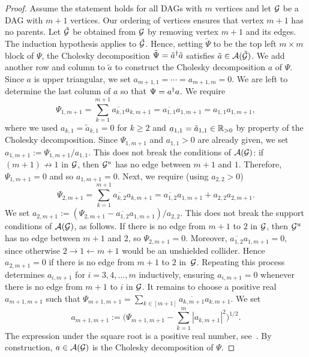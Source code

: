 \begin{proof}
	Assume the statement holds for all DAGs with $m$ vertices and let $\mathcal{G}$ be a DAG with $m+1$ vertices. Our ordering of vertices ensures that vertex $m+1$ has no parents. Let $\tilde{\mathcal{G}}$ be obtained from $\mathcal{G}$ by removing vertex $m+1$ and its edges.
	The induction hypothesis applies to $\tilde{\mathcal{G}}$.
	Hence, setting $\tilde{\Psi}$ to be the top left $m \times m$ block of $\Psi$,
	the Cholesky decomposition $\tilde{\Psi} = \tilde{a}^{\dagger} \tilde{a}$ satisfies $\tilde{a} \in \mathcal{A}(\tilde{\mathcal{G}})$. We add another row and column to $\tilde{a}$ to construct the Cholesky decomposition $a$ of $\Psi$.
	Since $a$ is upper triangular, we set $a_{m+1,1} = \cdots = a_{m+1,m} = 0$. We are left to determine the last column of $a$ so that $\Psi = a^{\dagger} a$.
	We require
	\[\Psi_{1,m+1} = \sum_{k=1}^{m+1} \overline{a_{k,1}} a_{k,m+1} = \overline{a_{1,1}} a_{1,m+1} = a_{1,1} a_{1,m+1}, \]
	where we used $a_{k,1} = \tilde{a}_{k,1} = 0$ for $k \geq 2$ and $a_{1,1} = \tilde{a}_{1,1} \in \mathbb R_{>0}$ by property of the Cholesky decomposition.
	Since $\Psi_{1,m+1}$ and $a_{1,1} > 0$ are already given, we set $a_{1,m+1} := \Psi_{1,m+1} / a_{1,1}$. This does not break the conditions of $\mathcal{A}(\mathcal{G})$: if $(m+1) \not\to 1$ in $\mathcal{G}$, then $\mathcal{G}^u$ has no edge between $m+1$ and $1$. Therefore, $\Psi_{1,m+1} = 0$ and so $a_{1,m+1} = 0$.
	Next, we require (using $a_{2,2} > 0$)
	\[\Psi_{2,m+1} = \sum_{k=1}^{m+1} \overline{a_{k,2}} a_{k,m+1} = \overline{a_{1,2}} a_{1,m+1} + a_{2,2} a_{2,m+1}. \]
	We set $a_{2,m+1} := (\Psi_{2,m+1} - \overline{a_{1,2}} a_{1,m+1}) / a_{2,2}$. This does not break the support conditions of $\mathcal{A}(\mathcal{G})$, as follows. If there is no edge from $m+1$ to $2$ in $\mathcal{G}$, then $\mathcal{G}^u$ has no edge between $m+1$ and $2$, so $\Psi_{2,m+1} = 0$. Moreover, $\overline{a_{1,2}} a_{1,m+1} = 0$, since otherwise $2 \to 1 \leftarrow m+1$ would be an unshielded collider. Hence $a_{2,m+1} = 0$ if there is no edge from $m+1$ to $2$ in~$\mathcal{G}$. Repeating this process determines $a_{i,m+1}$ for $i = 3,4,\ldots,m$ inductively, ensuring $a_{i,m+1} = 0$ whenever there is no edge from $m+1$ to $i$ in $\mathcal{G}$.
	It remains to choose a positive real $a_{m+1,m+1}$ such that $\Psi_{m+1,m+1} = \sum_{k \in [m+1]} \overline{a_{k,m+1}} a_{k,m+1}$. We set
	\[a_{m+1,m+1} := \Big( \Psi_{m+1,m+1} - \sum_{k=1}^m |a_{k,m+1}|^2 \Big)^{1/2}. \]
	The expression under the square root is a positive real number, see~\cite[Lecture 23]{trefethen1997numerical}. By construction, $a \in \mathcal{A}(\mathcal{G})$ is the Cholesky decomposition of $\Psi$.
\end{proof}

